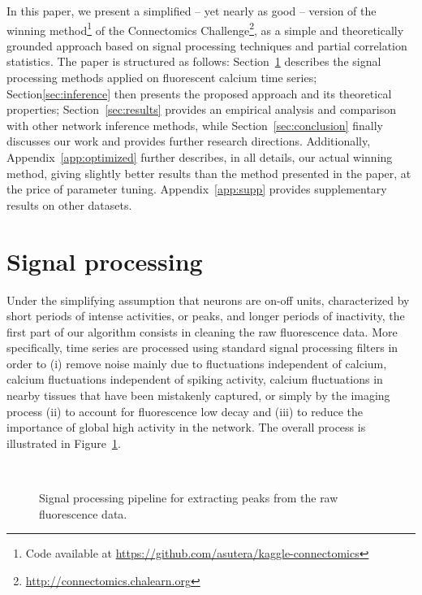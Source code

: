 \documentclass[wcp]{jmlr}
\begin{document}
In this paper, we present a simplified -- yet nearly as good -- version of the
winning method\footnote{Code available at \url{https://github.com/asutera/kaggle-connectomics}} of the Connectomics
Challenge\footnote{\url{http://connectomics.chalearn.org}}, as a simple and
theoretically grounded approach based on signal processing techniques and
partial correlation statistics. The paper is structured as follows:
Section~\ref{sec:filter} describes the signal processing methods applied on
fluorescent calcium time series; Section\ref{sec:inference} then presents the
proposed approach and its theoretical properties; Section~\ref{sec:results}
provides an empirical analysis and comparison with other network inference
methods, while Section~\ref{sec:conclusion} finally discusses our work and
provides further research directions. Additionally,
Appendix~\ref{app:optimized} further describes, in all details, our actual
winning method, giving slightly better results than the method presented in
the paper, at the price of parameter tuning. Appendix~\ref{app:supp} provides supplementary results on other datasets.


\section{Signal processing} \label{sec:filter}

Under the simplifying assumption that neurons are on-off units, characterized
by short periods of intense activities, or peaks, and longer periods of
inactivity, the first part of our algorithm consists in cleaning the raw
fluorescence data.
More specifically, time series are processed using standard
signal processing filters in order to (i) remove noise mainly due to fluctuations independent of calcium, calcium fluctuations independent of spiking activity, calcium fluctuations in nearby tissues that have been mistakenly captured, or simply by the imaging process (ii) to account for fluorescence low decay and (iii) to reduce the importance of
global high activity in the network. The overall process is illustrated in
Figure~\ref{fig:filtered-signal}.

\begin{figure}
\centering
{}
\\
\caption{Signal processing pipeline for extracting peaks from the raw fluorescence data.}
\label{fig:filtered-signal}
\end{figure}
\end{document}
